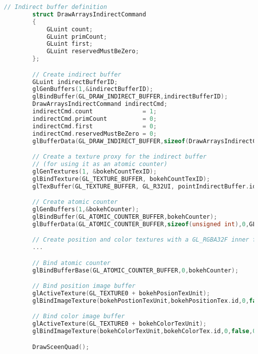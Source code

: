 \begin{lstlisting}[language=C++,float={htb},caption={Host application for extracting \bokehs \emph{(Pass 2)}.},label={DeRousiers:bokehextractioncpp}]
		// Indirect buffer definition
		struct DrawArraysIndirectCommand
		{
			GLuint count;
			GLuint primCount;
			GLuint first;
			GLuint reservedMustBeZero;
		};

		// Create indirect buffer
		GLuint indirectBufferID;
		glGenBuffers(1,&indirectBufferID);
		glBindBuffer(GL_DRAW_INDIRECT_BUFFER,indirectBufferID);
		DrawArraysIndirectCommand indirectCmd;
		indirectCmd.count              = 1;
		indirectCmd.primCount          = 0;
		indirectCmd.first              = 0;
		indirectCmd.reservedMustBeZero = 0;
		glBufferData(GL_DRAW_INDIRECT_BUFFER,sizeof(DrawArraysIndirectCommand),&indirecCmd,GL_DYNAMIC_DRAW);

		// Create a texture proxy for the indirect buffer 
		// (for using it as an atomic counter)
		glGenTextures(1, &bokehCountTexID);
		glBindTexture(GL_TEXTURE_BUFFER, bokehCountTexID);
		glTexBuffer(GL_TEXTURE_BUFFER, GL_R32UI, pointIndirectBuffer.id);

		// Create atomic counter
		glGenBuffers(1,&bokehCounter);
		glBindBuffer(GL_ATOMIC_COUNTER_BUFFER,bokehCounter);
		glBufferData(GL_ATOMIC_COUNTER_BUFFER,sizeof(unsigned int),0,GL_DYNAMIC_DRAW);

		// Create position and color textures with a GL_RGBA32F inner format
		...

		// Bind atomic counter
		glBindBufferBase(GL_ATOMIC_COUNTER_BUFFER,0,bokehCounter);

		// Bind position image buffer
		glActiveTexture(GL_TEXTURE0 + bokehPosionTexUnit);
		glBindImageTexture(bokehPostionTexUnit,bokehPositionTex.id,0,false,0,GL_WRITE_ONLY,GL_RGBA32F);

		// Bind color image buffer
		glActiveTexture(GL_TEXTURE0 + bokehColorTexUnit);
		glBindImageTexture(bokehColorTexUnit,bokehColorTex.id,0,false,0,GL_WRITE_ONLY,GL_RGBA32F);

		DrawSceenQuad();
\end{lstlisting}



